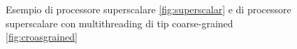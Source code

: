 \begin{figure}[htb]
\centering
{}
\caption{Esempio di processore superscalare \ref{fig:superscalar} e di processore superscalare con multithreading di tip coarse-grained \ref{fig:croasgrained}}
\end{figure}
